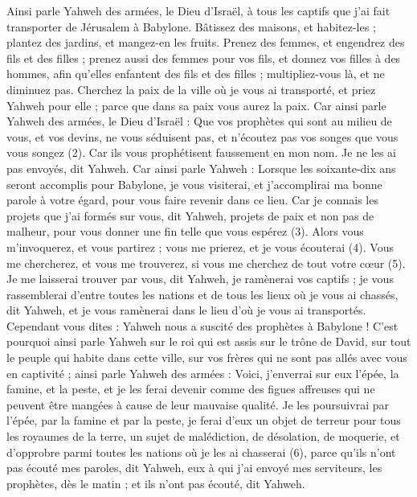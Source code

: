 \begin{multicols}{2}
Ainsi parle Yahweh des armées, le Dieu d'Israël, à tous les captifs que j'ai fait transporter de Jérusalem à Babylone.
Bâtissez des maisons, et habitez-les ; plantez des jardins, et mangez-en les fruits.
Prenez des femmes, et engendrez des fils et des filles ; prenez aussi des femmes pour vos fils, et donnez vos filles à des hommes, afin qu'elles enfantent des fils et des filles ; multipliez-vous là, et ne diminuez pas.
Cherchez la paix de la ville où je vous ai transporté, et priez Yahweh pour elle ; parce que dans sa paix vous aurez la paix.
Car ainsi parle Yahweh des armées, le Dieu d'Israël : Que vos prophètes qui sont au milieu de vous, et vos devins, ne vous séduisent pas, et n’écoutez pas vos songes que vous vous songez\FTNT{} (2).
Car ils vous prophétisent faussement en mon nom. Je ne les ai pas envoyés, dit Yahweh.
Car ainsi parle Yahweh : Lorsque les soixante-dix ans seront accomplis pour Babylone, je vous visiterai, et j’accomplirai ma bonne parole à votre égard, pour vous faire revenir dans ce lieu.
Car je connais les projets que j'ai formés sur vous, dit Yahweh, projets de paix et non pas de malheur, pour vous donner une fin telle que vous espérez\FTNT{} (3).
Alors vous m'invoquerez, et vous partirez ; vous me prierez, et je vous écouterai\FTNT{} (4).
Vous me chercherez, et vous me trouverez, si vous me cherchez de tout votre cœur\FTNT{} (5).
Je me laisserai trouver par vous, dit Yahweh, je ramènerai vos captifs ; je vous rassemblerai d'entre toutes les nations et de tous les lieux où je vous ai chassés, dit Yahweh, et je vous ramènerai dans le lieu d’où je vous ai transportés.
Cependant vous dites : Yahweh nous a suscité des prophètes à Babylone !
C'est pourquoi ainsi parle Yahweh sur le roi qui est assis sur le trône de David, sur tout le peuple qui habite dans cette ville, sur vos frères qui ne sont pas allés avec vous en captivité ;
ainsi parle Yahweh des armées : Voici, j’enverrai sur eux l'épée, la famine, et la peste, et je les ferai devenir comme des figues affreuses qui ne peuvent être mangées à cause de leur mauvaise qualité.
Je les poursuivrai par l'épée, par la famine et par la peste, je ferai d’eux un objet de terreur pour tous les royaumes de la terre, un sujet de malédiction, de désolation, de moquerie, et d’opprobre parmi toutes les nations où je les ai chasserai\FTNT{} (6),
parce qu'ils n'ont pas écouté mes paroles, dit Yahweh, eux à qui j’ai envoyé mes serviteurs, les prophètes, dès le matin ; et ils n'ont pas écouté, dit Yahweh.

\end{multicols}
